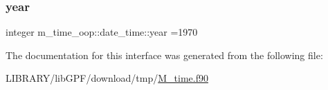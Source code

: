 \subsubsection{\texorpdfstring{year}{year}}
{\footnotesize\ttfamily integer m\+\_\+time\+\_\+oop\+::date\+\_\+time\+::year =1970\hspace{0.3cm}{\ttfamily [private]}}



The documentation for this interface was generated from the following file\+:\begin{DoxyCompactItemize}
\item 
L\+I\+B\+R\+A\+R\+Y/lib\+G\+P\+F/download/tmp/\hyperlink{M__time_8f90}{M\+\_\+time.\+f90}\end{DoxyCompactItemize}
